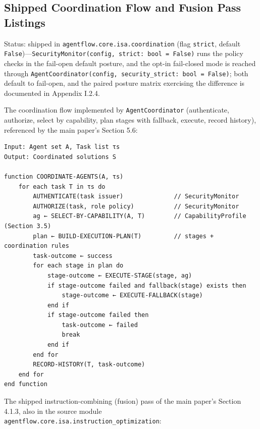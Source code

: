 \documentclass[
  11pt,
]{article}
\begin{document}
\subsection{Shipped Coordination Flow and Fusion Pass
Listings}\label{shipped-coordination-flow-and-fusion-pass-listings}

Status: shipped in \texttt{agentflow.core.isa.coordination} (flag
\texttt{strict}, default
\texttt{False})---\texttt{SecurityMonitor(config,\ strict:\ bool\ =\ False)}
runs the policy checks in the fail-open default posture, and the opt-in
fail-closed mode is reached through
\texttt{AgentCoordinator(config,\ security\_strict:\ bool\ =\ False)};
both default to fail-open, and the paired posture matrix exercising the
difference is documented in Appendix I.2.4.

The coordination flow implemented by \texttt{AgentCoordinator}
(authenticate, authorize, select by capability, plan stages with
fallback, execute, record history), referenced by the main paper's
Section 5.6:

\begin{verbatim}
Input: Agent set A, Task list τs
Output: Coordinated solutions S

function COORDINATE-AGENTS(A, τs)
    for each task T in τs do
        AUTHENTICATE(task issuer)              // SecurityMonitor
        AUTHORIZE(task, role policy)           // SecurityMonitor
        ag ← SELECT-BY-CAPABILITY(A, T)        // CapabilityProfile (Section 3.5)
        plan ← BUILD-EXECUTION-PLAN(T)         // stages + coordination rules
        task-outcome ← success
        for each stage in plan do
            stage-outcome ← EXECUTE-STAGE(stage, ag)
            if stage-outcome failed and fallback(stage) exists then
                stage-outcome ← EXECUTE-FALLBACK(stage)
            end if
            if stage-outcome failed then
                task-outcome ← failed
                break
            end if
        end for
        RECORD-HISTORY(T, task-outcome)
    end for
end function
\end{verbatim}

The shipped instruction-combining (fusion) pass of the main paper's
Section 4.1.3, also in the source module
\texttt{agentflow.core.isa.instruction\_optimization}:
\end{document}
